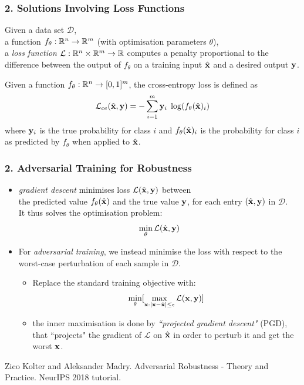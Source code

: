 \documentclass[aspectratio=169]{beamer}
\newcommand{\distance}[2]{|#1 - #2|}
\newcommand{\xs}{\x} 			%
\begin{document}
\begin{frame}
  \frametitle{2. Solutions Involving Loss Functions}
Given a data set $\mathcal{D} $,\\  a function  ${f_{\theta}: {\mathbb R}^n \rightarrow {\mathbb R}^m}$ (with optimisation parameters $\theta$),\\
	a \emph{loss function} $\mathcal{L}: {\mathbb R}^n \times {\mathbb R}^m \rightarrow {\mathbb R}$ computes a penalty proportional to the difference between the output of $f_{\theta}$ on a training input $\hat{\mathbf{x}}$ and a desired output $\mathbf{y}$.\pause


\begin{example}
	\label{eq:cross-entropy}
	Given a function  ${f_{\theta}: {\mathbb R}^n \rightarrow [0,1]^m}$, the cross-entropy loss is defined as 
	\begin{equation}\label{eq:ce}
	\mathcal{L}_{ce}(\hat{\mathbf{x}}, \mathbf{y}) = - \sum_{i=1}^{m} \mathbf{y}_i \; \log(f_{\theta}(\hat{\mathbf{x}})_i)
	\end{equation}
	where $\mathbf{y}_i$ is the true probability for class $i$ and $f_{\theta}(\hat{\mathbf{x}})_i$ is the probability for class $i$ as predicted by $f_{\theta}$ when applied to $\hat{\mathbf{x}}$.
\end{example}

\end{frame}

 

\begin{frame}
  \frametitle{2. Adversarial Training  for Robustness}

  \begin{itemize}
  \item  \emph{gradient descent}  minimises loss $\mathcal{L}(\hat{\mathbf{x}}, \mathbf{y})$ between\\ the predicted value $f_{\theta}(\hat{\mathbf{x}})$ and the true value $\mathbf{y}$, for each entry $(\hat{\mathbf{x}}, \mathbf{y})$ in $\mathcal{D}$.\\ It thus solves the optimisation problem:
  $$ \min_{\theta} \mathcal{L}(\hat{\mathbf{x}}, \mathbf{y}) $$
  \pause
  \item For \emph{adversarial training}, we instead minimise the loss with respect to the worst-case perturbation of each sample in $\mathcal{D}$.
\begin{itemize}
     \item Replace the standard training objective with:
$$\min_{\theta} [ \max_{\xs : \distance{\xs}{\xt} \leq \epsilon} \lossfn(\xs, \y)]$$
 \item the inner maximisation is done by \emph{``projected gradient descent"} (PGD), that ``projects" the gradient of $\mathcal{L}$ on $\hat{\mathbf{x}}$ in order to perturb it and get the worst $\xs$.  

\end{itemize}
\end{itemize}

 {\scriptsize
   \begin{thebibliography}{99}
        \beamertemplatearticlebibitems
    Zico Kolter and Aleksander Madry. Adversarial Robustness - Theory and Practice. NeurIPS 2018 tutorial.

 \end{thebibliography}}

\end{frame}
\end{document}
